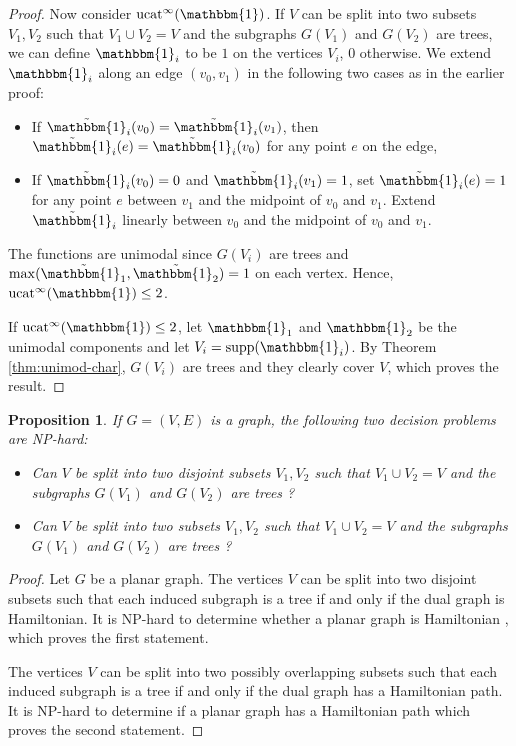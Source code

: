 \documentclass[11pt]{article}
\DeclareMathOperator{\ucat}{ucat}
\newtheorem{prp}[thm]{Proposition}
\newcommand{\supp}{\text{supp}}
\begin{document}
\begin{proof}
Now consider $\ucat^{\infty}(\mathbbm{1})$. If $V$ can be split into two subsets $V_1, V_2$ such that $V_1 \cup V_2 = V$ and the subgraphs $G(V_1)$ and $G(V_2)$ are trees, we can define $\mathbbm{1}_i$ to be $1$ on the vertices $V_i$, $0$ otherwise. We extend $\mathbbm{1}_i$ along an edge $(v_0, v_1)$ in the following two cases as in the earlier proof:
\begin{itemize}
\item If $\tilde{\mathbbm{1}}_i(v_0) = \tilde{\mathbbm{1}}_i(v_1)$, then $\tilde{\mathbbm{1}}_i(e) = \tilde{\mathbbm{1}}_i(v_0)$ for any point $e$ on the edge,
\item If $\tilde{\mathbbm{1}}_i(v_0) = 0$ and $\tilde{\mathbbm{1}}_i(v_1) = 1$, set $\tilde{\mathbbm{1}}_i(e) = 1$ for any point $e$ between $v_1$ and the midpoint of $v_0$ and $v_1$. Extend $\tilde{\mathbbm{1}}_i$ linearly between $v_0$ and the midpoint of $v_0$ and $v_1$.
\end{itemize}
 The functions are unimodal since $G(V_i)$ are trees and $\max(\tilde{\mathbbm{1}_1}, \tilde{\mathbbm{1}_2}) = 1$ on each vertex. Hence, $\ucat^{\infty}(\mathbbm{1}) \leq 2$.
 
If $\ucat^{\infty}(\mathbbm{1}) \leq 2$, let $\mathbbm{1}_1$ and $\mathbbm{1}_2$ be the unimodal components and let $V_i = \supp(\mathbbm{1}_i)$. By Theorem \ref{thm:unimod-char}, $G(V_i)$ are trees and they clearly cover $V$, which proves the result.
\end{proof}

\begin{prp}
\label{prp:dec}
If $G=(V,E)$ is a graph, the following two decision problems are NP-hard:
\begin{itemize}
\item Can $V$ be split into two disjoint subsets $V_1, V_2$ such that $V_1 \cup V_2 = V$ and the subgraphs $G(V_1)$ and $G(V_2)$ are trees ?
\item Can $V$ be split into two subsets $V_1, V_2$ such that $V_1 \cup V_2 = V$ and the subgraphs $G(V_1)$ and $G(V_2)$ are trees ?
\end{itemize}
\end{prp}
\begin{proof}
Let $G$ be a planar graph. The vertices $V$ can be split into two disjoint subsets such that each induced subgraph is a tree if and only if the dual graph is Hamiltonian. It is NP-hard to determine whether a planar graph is Hamiltonian \cite{Gar76}, which proves the first statement. 

The vertices $V$ can be split into two possibly overlapping subsets such that each induced subgraph is a tree if and only if the dual graph has a Hamiltonian path. It is NP-hard to determine if a planar graph has a Hamiltonian path \cite{Gar74} which proves the second
statement.
\end{proof}
\end{document}
